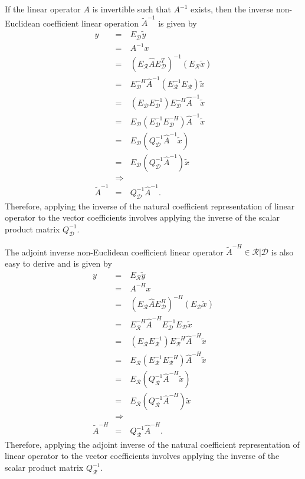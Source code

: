 \documentclass[pdf,ps2pdf,11pt]{SANDreport}
\begin{document}
If the linear operator $A$ is invertible such that $A^{-1}$ exists, then the
inverse non-Euclidean coefficient linear operation $\tilde{A}^{-1}$ is given
by
%
\begin{eqnarray}
y
& = & E_{\mathcal{D}} \tilde{y} \nonumber \\
& = & A^{-1} x \nonumber \\
& = & (E_{\mathcal{R}} \hat{A} E_{\mathcal{D}}^T)^{-1} (E_{\mathcal{R}} \tilde{x}) \nonumber \\
& = & E_{\mathcal{D}}^{-H} \hat{A}^{-1} (E_{\mathcal{R}}^{-1} E_{\mathcal{R}}) \tilde{x}  \nonumber \\
& = & ( E_{\mathcal{D}} E_{\mathcal{D}}^{-1} ) E_{\mathcal{D}}^{-H} \hat{A}^{-1} \tilde{x}  \nonumber \\
& = & E_{\mathcal{D}} (E_{\mathcal{D}}^{-1} E_{\mathcal{D}}^{-H}) \hat{A}^{-1} \tilde{x}  \nonumber \\
& = & E_{\mathcal{D}} ( Q_{\mathcal{D}}^{-1} \hat{A}^{-1} \tilde{x} ) \nonumber \\
& = & E_{\mathcal{D}} ( Q_{\mathcal{D}}^{-1} \hat{A}^{-1} ) \tilde{x} \nonumber \\
& \Rightarrow &  \nonumber \\
\tilde{A}^{-1} & = & Q_{\mathcal{D}}^{-1} \hat{A}^{-1}.
\label{eqn:A_natural_matrix_inverse_apply}
\end{eqnarray}
%
Therefore, applying the inverse of the natural coefficient representation of
linear operator to the vector coefficients involves applying the inverse of
the scalar product matrix $Q_{\mathcal{D}}^{-1}$.

The adjoint inverse non-Euclidean coefficient linear operator
$\tilde{A}^{-H}\in\mathcal{R}|\mathcal{D}$ is also easy to derive and is given
by
%
\begin{eqnarray}
y
& = & E_{\mathcal{R}} \tilde{y} \nonumber \\
& = & A^{-H} x \nonumber \\
& = & (E_{\mathcal{R}} \hat{A} E_{\mathcal{D}}^H)^{-H} (E_{\mathcal{D}} \tilde{x}) \nonumber \\
& = & E_{\mathcal{R}}^{-H} \hat{A}^{-H} E_{\mathcal{D}}^{-1} E_{\mathcal{D}} \tilde{x}  \nonumber \\
& = & ( E_{\mathcal{R}} E_{\mathcal{R}}^{-1} ) E_{\mathcal{R}}^{-H} \hat{A}^{-H} \tilde{x}  \nonumber \\
& = & E_{\mathcal{R}} (E_{\mathcal{R}}^{-1} E_{\mathcal{R}}^{-H}) \hat{A}^{-H} \tilde{x}  \nonumber \\
& = & E_{\mathcal{R}} ( Q_{\mathcal{R}}^{-1} \hat{A}^{-H} \tilde{x} ) \nonumber \\
& = & E_{\mathcal{R}} ( Q_{\mathcal{R}}^{-1} \hat{A}^{-H} ) \tilde{x} \nonumber \\
& \Rightarrow &  \nonumber \\
\tilde{A}^{-H} & = & Q_{\mathcal{R}}^{-1} \hat{A}^{-H}.
\label{eqn:A_natural_matrix_adjoint_inverse_apply}
\end{eqnarray}
%
Therefore, applying the adjoint inverse of the natural coefficient
representation of linear operator to the vector coefficients involves applying
the inverse of the scalar product matrix $Q_{\mathcal{R}}^{-1}$.
\end{document}
